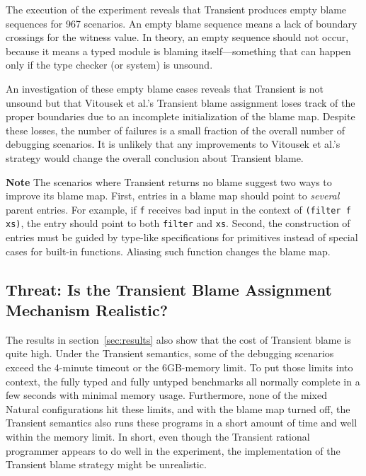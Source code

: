 The execution of the experiment reveals that Transient produces empty blame
sequences for 967 scenarios. An empty blame sequence means a lack of boundary
crossings for the witness value. In theory, an empty sequence should not occur,
because it means a typed module is blaming itself---something that can happen only
if the type checker (or system) is unsound.

An investigation of these empty blame cases reveals that Transient is not
unsound but that Vitousek et al.'s Transient blame assignment loses track
of the proper boundaries due to an incomplete initialization of the blame map.
Despite these losses, the number of failures is a small fraction of the
overall number of debugging scenarios. It is unlikely that any
improvements to Vitousek et al.'s strategy would change the overall
conclusion about Transient blame.

{\bf Note} The scenarios where Transient returns no blame suggest two ways to
improve its blame map.  First, entries in a blame map should point to {\em
several\/} parent entries.  For example, if \texttt{f} receives bad input in the
context of {\tt (filter f xs)}, the entry should point to both \texttt{filter}
and \texttt{xs}. Second, the construction of entries must be guided by type-like
specifications for primitives instead of special cases for built-in
functions. Aliasing such function changes the blame map.  


\subsection{Threat: Is the Transient Blame Assignment Mechanism Realistic?}
\label{sec:threat:transient2}

The results in section~\ref{sec:results} also show that the cost of Transient
blame is quite high. Under the Transient semantics, some of the debugging
scenarios exceed the 4-minute timeout or the 6GB-memory limit. To put those
limits into context, the fully typed and fully untyped benchmarks all normally complete
in a few seconds with minimal memory usage. Furthermore, none of the mixed
Natural configurations hit these limits, and with the blame map turned off,
the Transient semantics also runs these programs in a short amount of time and
well within the memory limit. In short, even though the Transient rational
programmer appears to do well in the experiment, the implementation of the
Transient blame strategy might be unrealistic. 

